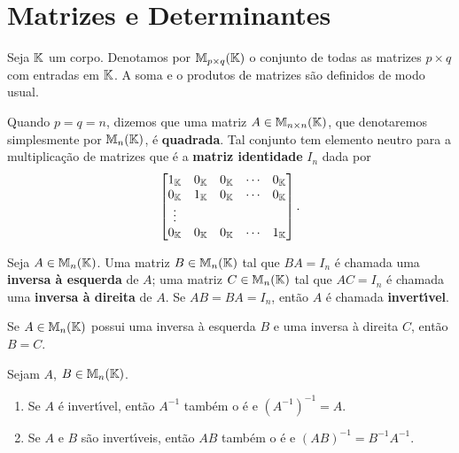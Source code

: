 \section{Matrizes e Determinantes}

Seja $\mathbb{K}$ um corpo. Denotamos por $\mathbb{M}_{p \times q}(\mathbb{K})$ o conjunto de todas as matrizes $p \times q$ com entradas em $\mathbb{K}$. A soma e o produtos de matrizes s\~ao definidos de modo usual.

Quando $p = q = n$, dizemos que uma matriz $A \in \mathbb{M}_{n \times n}(\mathbb{K})$, que denotaremos simplesmente por $\mathbb{M}_{n}(\mathbb{K})$, \'e \textbf{quadrada}.
Tal conjunto tem elemento neutro para a multiplica\c{c}\~ao de matrizes que \'e a \textbf{matriz identidade} $I_n$ dada por
\[
	\begin{bmatrix}
		1_{\mathbb{K}} & 0_{\mathbb{K}} & 0_{\mathbb{K}} & \cdots & 0_{\mathbb{K}}\\
		0_{\mathbb{K}} & 1_{\mathbb{K}} & 0_{\mathbb{K}} & \cdots & 0_{\mathbb{K}}\\
		\vdots\\
		0_{\mathbb{K}} & 0_{\mathbb{K}} & 0_{\mathbb{K}} & \cdots & 1_{\mathbb{K}}
	\end{bmatrix}.
\]

\begin{definicao}
	Seja $A \in \mathbb{M}_{n}(\mathbb{K})$. Uma matriz $B \in \mathbb{M}_{n}(\mathbb{K})$ tal que $BA = I_n$ \'e chamada uma \textbf{inversa \`a esquerda} de $A$; uma matriz $C \in \mathbb{M}_{n}(\mathbb{K})$ tal que $AC = I_n$ \'e chamada uma \textbf{inversa \`a direita} de $A$. Se $AB = BA = I_n$, ent\~ao $A$ \'e chamada \textbf{invert{\'\i}vel}.
\end{definicao}

\begin{proposicao}
	Se $A \in \mathbb{M}_{n}(\mathbb{K})$ possui uma inversa \`a esquerda $B$ e uma inversa \`a direita $C$, ent\~ao $B = C$.
\end{proposicao}

\begin{proposicao}
	Sejam $A$, $B \in \mathbb{M}_{n}(\mathbb{K})$.
	\begin{enumerate}[label={\roman*})]
		\item Se $A$ \'e invert{\'\i}vel, ent\~ao $A^{-1}$ tamb\'em o \'e e $(A^{-1})^{-1} = A$.
		\item Se $A$ e $B$ s\~ao invert{\'\i}veis, ent\~ao $AB$ tamb\'em o \'e e $(AB)^{-1} = B^{-1}A^{-1}$.
	\end{enumerate}
\end{proposicao}

